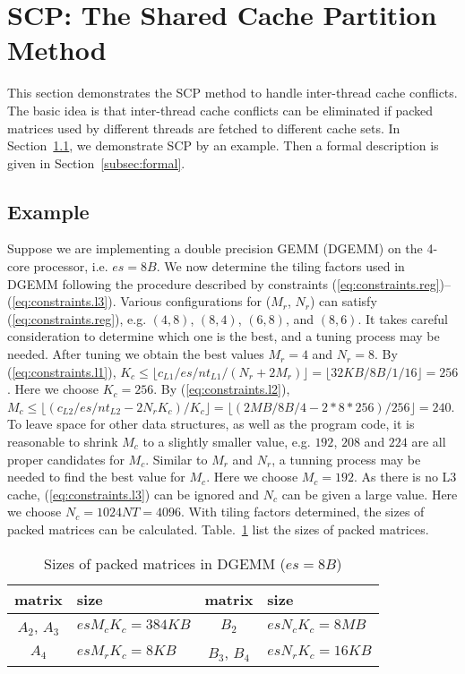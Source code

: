 \section{SCP: The Shared Cache Partition Method}\label{sec:scp}

This section demonstrates the SCP method to handle inter-thread cache conflicts.
The basic idea is that inter-thread cache conflicts can be eliminated
if packed matrices used by different threads are fetched to different cache sets.
In Section~\ref{subsec:example}, we demonstrate SCP by an example.
Then a formal description is given in Section~\ref{subsec:formal}.

\subsection{Example}\label{subsec:example}

Suppose we are implementing a double precision GEMM (DGEMM) on
the 4-core processor, i.e. $es=8B$.
We now determine the tiling factors used in DGEMM following the procedure described
by constraints (\ref{eq:constraints.reg})--(\ref{eq:constraints.l3}).
Various configurations for ($M_r$, $N_r$) can satisfy (\ref{eq:constraints.reg}),
e.g. $(4,8)$, $(8,4)$, $(6,8)$, and $(8,6)$. 
It takes careful consideration to determine which one is the best,
and a tuning process may be needed.
After tuning we obtain the best values $M_r = 4$ and $N_r = 8$.
By (\ref{eq:constraints.l1}),
$K_c \le \lfloor c_{L1}/es/nt_{L1}/(N_r + 2 M_r) \rfloor = \lfloor 32KB/8B/1/16 \rfloor = 256$.
Here we choose $K_c=256$.
By (\ref{eq:constraints.l2}),
$M_c \le \lfloor (c_{L2}/es/nt_{L2} - 2 N_r K_c )/ K_c \rfloor =
\lfloor (2MB/8B/4 - 2*8*256)/256 \rfloor = 240$.
To leave space for other data structures, as well as the program code,
it is reasonable to shrink $M_c$ to a slightly smaller value,
e.g. $192$, $208$ and $224$ are all proper candidates for $M_c$.
Similar to $M_r$ and $N_r$, a tunning process may be needed to
find the best value for $M_c$.
Here we choose $M_c = 192$.
As there is no L3 cache, (\ref{eq:constraints.l3}) can be ignored
and $N_c$ can be given a large value.
Here we choose $N_c = 1024NT = 4096$.
With tiling factors determined, the sizes of packed matrices
can be calculated. Table.~\ref{tab:msizes} list the sizes of packed matrices.

\begin{table}
  \centering
  \caption{Sizes of packed matrices in DGEMM ($es = 8B$)}
  \label{tab:msizes}
  \begin{tabular}{cl|cl}
    \toprule
    matrix & size & matrix & size \\
    \midrule
    $A_2$, $A_3$ & $es M_c K_c = 384KB$ & $B_2$ & $es N_c K_c = 8MB$ \\
    $A_4$ & $es M_r K_c = 8KB$   & $B_3$, $B_4$ & $es N_r K_c = 16KB$ \\
    \bottomrule
  \end{tabular}
\end{table}

